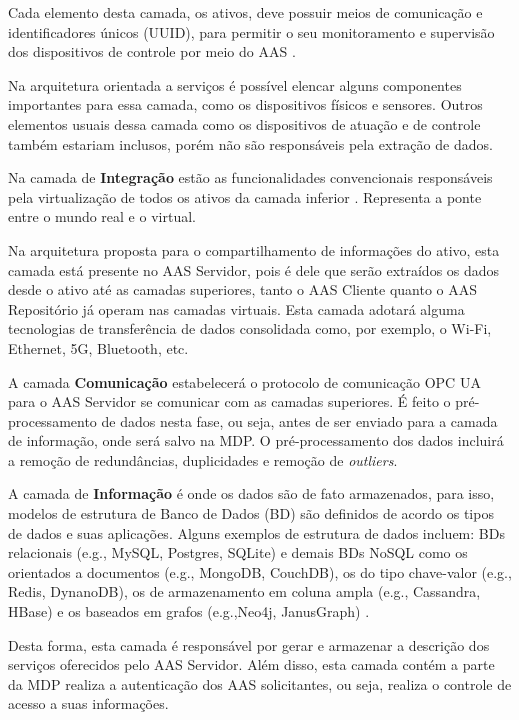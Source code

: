 	Cada elemento desta camada, os ativos, deve possuir meios de comunicação e identificadores únicos (UUID), para permitir o seu monitoramento e supervisão dos dispositivos de controle por meio do AAS \cite{adolphs2015rami}.
	
	Na arquitetura orientada a serviços é possível elencar alguns componentes importantes para essa camada, como os dispositivos físicos e sensores. Outros elementos usuais dessa camada como os dispositivos de atuação e de controle também estariam inclusos, porém não são responsáveis pela extração de dados.
	
	Na camada de \textbf{Integração} estão as funcionalidades convencionais responsáveis pela virtualização de todos os ativos da camada inferior \cite{adolphs2015rami}. Representa a ponte entre o mundo real e o virtual.
	
	Na arquitetura proposta para o compartilhamento de informações do ativo, esta camada está presente no AAS Servidor, pois é dele que serão extraídos os dados desde o ativo até as camadas superiores, tanto o AAS Cliente quanto o AAS Repositório já operam nas camadas virtuais. Esta camada adotará alguma tecnologias de transferência de dados consolidada como, por exemplo, o Wi-Fi, Ethernet, 5G, Bluetooth, etc.
	
	A camada \textbf{Comunicação} estabelecerá o protocolo de comunicação OPC UA para o AAS Servidor se comunicar com as camadas superiores. É feito o pré-processamento de dados nesta fase, ou seja, antes de ser enviado para a camada de informação, onde será salvo na MDP. O pré-processamento dos dados incluirá a remoção de redundâncias, duplicidades e remoção de \textit{outliers}.
	
	A camada de \textbf{Informação} é onde os dados são de fato armazenados, para isso, modelos de estrutura de Banco de Dados (BD) são definidos de acordo os tipos de dados e suas aplicações. Alguns exemplos de estrutura de dados incluem: BDs relacionais (e.g., MySQL, Postgres, SQLite) \cite{morris2017relationaldatabase} e demais BDs NoSQL como os orientados a documentos (e.g., MongoDB, CouchDB), os do tipo chave-valor (e.g., Redis, DynanoDB), os de armazenamento em coluna ampla (e.g., Cassandra, HBase) e os baseados em grafos (e.g.,Neo4j, JanusGraph) \cite{schaefer2019nosql}.
	
	Desta forma, esta camada é responsável por gerar e armazenar a descrição dos serviços oferecidos pelo AAS Servidor. Além disso, esta camada contém a parte da MDP realiza a autenticação dos AAS solicitantes, ou seja, realiza o controle de acesso a suas informações.
	
